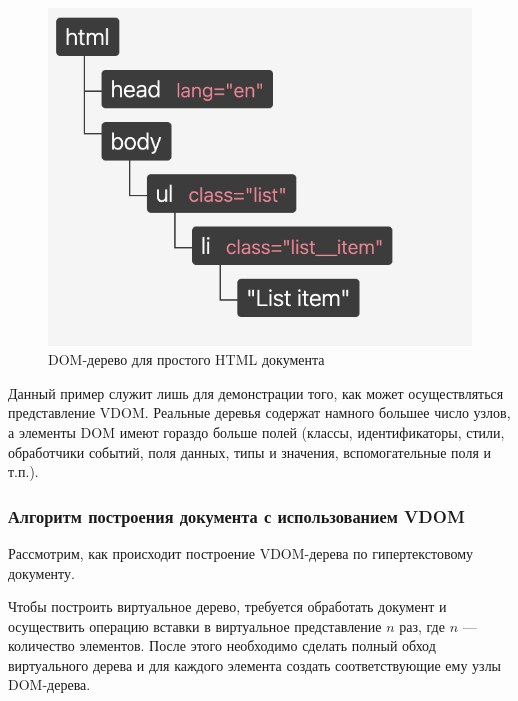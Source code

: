 \begin{figure}[h]
	\centering
	\includegraphics[width=140mm]{img/dom-to-vdom-dom.png}
	\caption{DOM-дерево для простого HTML документа}
	\label{fig:dom-to-vdom-dom}
\end{figure}


Данный пример служит лишь для демонстрации того, как может осуществляться представление VDOM. 
Реальные деревья содержат намного большее число узлов, а элементы DOM имеют гораздо больше полей (классы, идентификаторы, стили, обработчики событий, поля данных, типы и значения, вспомогательные поля и т.п.).

\subsubsection{Алгоритм построения документа с использованием VDOM}

Рассмотрим, как происходит построение VDOM-дерева по гипертекстовому документу.

Чтобы построить виртуальное дерево, требуется обработать документ и осуществить операцию вставки в виртуальное представление $n$ раз, где $n$ --- количество элементов. 
После этого необходимо сделать полный обход виртуального дерева и для каждого элемента создать соответствующие ему узлы DOM-дерева.

